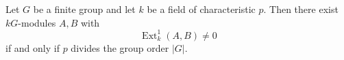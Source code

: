 Let $G$ be a finite group and let $k$ be a field of characteristic $p$. Then there exist $kG$-modules $A, B$ with
$$\operatorname{Ext}_k^1(A, B) \neq 0$$
if and only if $p$ divides the group order $|G|$.
